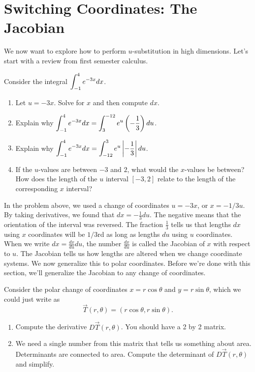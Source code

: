 \section{Switching Coordinates: The Jacobian}

We now want to explore how to perform $u$-substitution in high dimensions. Let's start with a review from first semester calculus.

\begin{problem}
Consider the integral $\displaystyle\int_{-1}^4 e^{-3x} dx$.  
\begin{enumerate}
 \item Let $u=-3x$.  Solve for $x$ and then compute $dx$.
 \item Explain why $\displaystyle\int_{-1}^4 e^{-3x} dx=\int_{3}^{-12}e^u \left(-\frac{1}{3}\right)du$.  
 \item Explain why $\displaystyle\int_{-1}^4 e^{-3x} dx=\int_{-12}^{3}e^u \left|-\frac{1}{3}\right| du$.
 \item If the $u$-values are between $-3$ and $2$, what would the $x$-values be between? How does the  length of the $u$ interval $[-3,2]$ relate to the length of the corresponding $x$ interval?
\end{enumerate}
\end{problem}

In the problem above, we used a change of coordinates $u=-3x$, or $x=-1/3 u$.  By taking derivatives, we found that $dx=-\frac{1}{3}du$. The negative means that the orientation of the interval was reversed. The fraction $\frac13$ tells us that lengths $dx$ using $x$ coordinates will be $1/3$rd as long as lengths $du$ using $u$ coordinates. When we write $dx = \frac{dx}{du}du$, the number $\frac{dx}{du}$ is called the Jacobian of $x$ with respect to $u$. The Jacobian tells us how lengths are altered when we change coordinate systems. We now generalize this to polar coordinates. Before we're done with this section, we'll generalize the Jacobian to any change of coordinates.

\begin{problem}
 Consider the polar change of coordinates $x=r\cos\theta$ and $y=r\sin\theta$, which we could just write as $$\vec T(r,\theta)=(r\cos\theta,r\sin\theta).$$
\begin{enumerate}
 \item Compute the derivative $D\vec T(r,\theta)$.  You should have a 2 by 2 matrix.
 \item We need a single number from this matrix that tells us something about area.  Determinants are connected to area.  Compute the determinant of $D\vec T(r,\theta)$ and simplify.  
\end{enumerate}
\end{problem}

